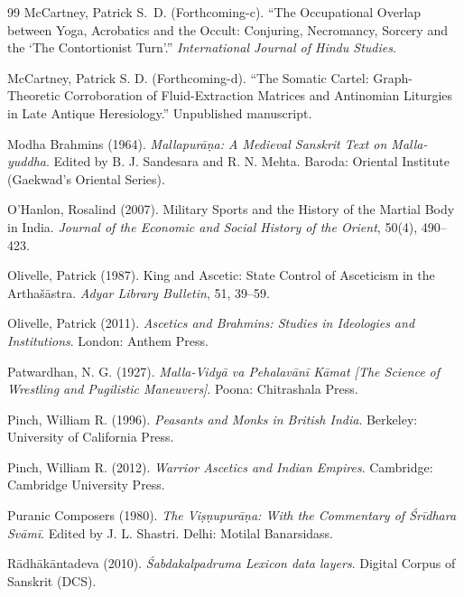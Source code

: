 \documentclass[11pt,twoside,letterpaper]{article}
\begin{document}
\begin{thebibliography}{99}
McCartney, Patrick S.~D. (Forthcoming-c). ``The Occupational Overlap between Yoga, Acrobatics and the Occult: Conjuring, Necromancy, Sorcery and the `The Contortionist Turn'.'' \textit{International Journal of Hindu Studies}.

McCartney, Patrick S. D. (Forthcoming-d). 
\newblock ``The Somatic Cartel: Graph-Theoretic Corroboration of Fluid-Extraction Matrices and Antinomian Liturgies in Late Antique Heresiology.'' 
\newblock Unpublished manuscript.

Modha Brahmins (1964). \textit{Mallapurāṇa: A Medieval Sanskrit Text on Malla-yuddha}. Edited by B. J. Sandesara and R. N. Mehta. Baroda: Oriental Institute (Gaekwad's Oriental Series).

O'Hanlon, Rosalind (2007). Military Sports and the History of the Martial Body in India. \textit{Journal of the Economic and Social History of the Orient}, 50(4), 490--423.

Olivelle, Patrick (1987). King and Ascetic: State Control of Asceticism in the Artha\v{s}\={a}stra. \textit{Adyar Library Bulletin}, 51, 39--59.

Olivelle, Patrick (2011). \textit{Ascetics and Brahmins: Studies in Ideologies and Institutions}. London: Anthem Press.

Patwardhan, N. G. (1927). \textit{Malla-Vidyā va Pehalavānī Kāmat [The Science of Wrestling and Pugilistic Maneuvers]}. Poona: Chitrashala Press.

Pinch, William R. (1996). \textit{Peasants and Monks in British India}. Berkeley: University of California Press.

Pinch, William R. (2012). \textit{Warrior Ascetics and Indian Empires}. Cambridge: Cambridge University Press.

Puranic Composers (1980). \textit{The Viṣṇupurāṇa: With the Commentary of Śrīdhara Svāmī}. Edited by J. L. Shastri. Delhi: Motilal Banarsidass.

Rādhākāntadeva (2010). \textit{Śabdakalpadruma Lexicon data layers}. Digital Corpus of Sanskrit (DCS).


\end{thebibliography}
\end{document}
